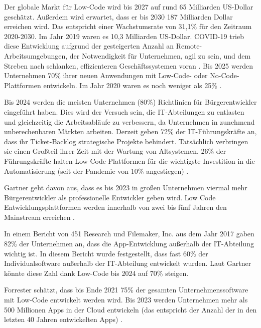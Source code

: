 \documentclass[12pt]{article} %
\begin{document}
	Der globale Markt für Low-Code wird bis 2027 auf rund 65 Milliarden US-Dollar geschätzt. Außerdem wird erwartet, dass er bis 2030 187 Milliarden Dollar erreichen wird. Das entspricht einer Wachstumsrate von 31,1\% für den Zeitraum 2020-2030.
	Im Jahr 2019 waren es 10,3 Milliarden US-Dollar. COVID-19 trieb diese Entwicklung aufgrund der gesteigerten Anzahl an Remote-Arbeitsumgebungen, der Notwendigkeit für Unternehmen, agil zu sein, und dem Streben nach schlanken, effizienteren Geschäftssystemen voran \autocite{KevinShuler.2023}.
	Bis 2025 werden Unternehmen 70\% ihrer neuen Anwendungen mit Low-Code- oder No-Code-Plattformen entwickeln. Im Jahr 2020 waren es noch weniger als 25\% \autocite{KevinShuler.2023}. \newline
	
	Bis 2024 werden die meisten Unternehmen (80\%) Richtlinien für Bürgerentwickler eingeführt haben. Dies wird der Versuch sein, die IT-Abteilungen zu entlasten und gleichzeitig die Arbeitsabläufe zu verbessern, da Unternehmen in zunehmend unberechenbaren Märkten arbeiten. 	
	Derzeit geben 72\% der IT-Führungskräfte an, dass ihr Ticket-Backlog strategische Projekte behindert. Tatsächlich verbringen sie einen Großteil ihrer Zeit mit der Wartung von Altsystemen. 26\% der Führungskräfte halten Low-Code-Plattformen für die wichtigste Investition in die Automatisierung (seit der Pandemie von 10\% angestiegen) \autocite{KevinShuler.2023}. \newline
	
	Gartner geht davon aus, dass es bis 2023 in großen Unternehmen viermal mehr Bürgerentwickler als professionelle Entwickler geben wird. Low Code Entwicklungsplattformen werden innerhalb von zwei bis fünf Jahren den Mainstream erreichen \autocite{KevinShuler.2023}. \newline
	
	In einem Bericht von 451 Research und Filemaker, Inc. aus dem Jahr 2017 gaben 82\% der Unternehmen an, dass die App-Entwicklung außerhalb der IT-Abteilung wichtig ist. In diesem Bericht wurde festgestellt, dass fast 60\% der Individualsoftware außerhalb der IT-Abteilung entwickelt wurden. Laut Gartner könnte diese Zahl dank Low-Code bis 2024 auf 70\% steigen. \newline
	
	Forrester schätzt, dass bis Ende 2021 75\% der gesamten Unternehmenssoftware mit Low-Code entwickelt werden wird. Bis 2023 werden Unternehmen mehr als 500 Millionen Apps in der Cloud entwickeln (das entspricht der Anzahl der in den letzten 40 Jahren entwickelten Apps) \autocite{KevinShuler.2023}. \newline
	
\end{document}
